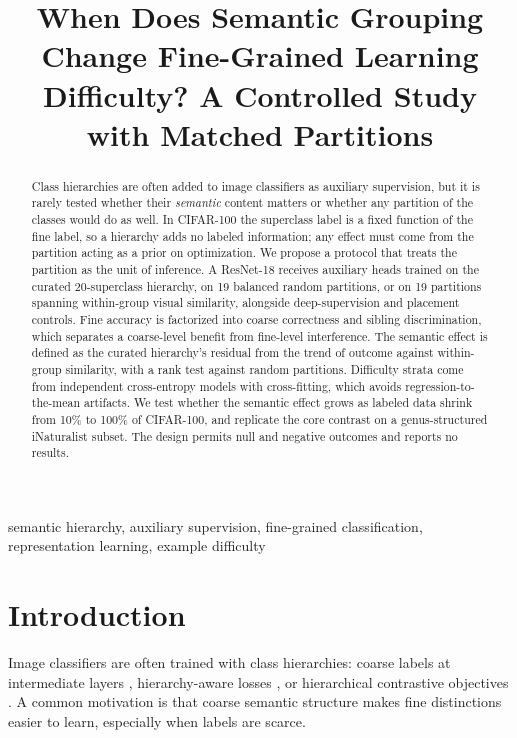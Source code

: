 \documentclass[conference]{IEEEtran}
\begin{document}
\title{When Does Semantic Grouping Change Fine-Grained Learning Difficulty? A Controlled Study with Matched Partitions}
\author{}
\maketitle

\begin{abstract}
Class hierarchies are often added to image classifiers as auxiliary supervision, but it is rarely tested whether their \emph{semantic} content matters or whether any partition of the classes would do as well. In CIFAR-100 the superclass label is a fixed function of the fine label, so a hierarchy adds no labeled information; any effect must come from the partition acting as a prior on optimization. We propose a protocol that treats the partition as the unit of inference. A ResNet-18 receives auxiliary heads trained on the curated 20-superclass hierarchy, on 19 balanced random partitions, or on 19 partitions spanning within-group visual similarity, alongside deep-supervision and placement controls. Fine accuracy is factorized into coarse correctness and sibling discrimination, which separates a coarse-level benefit from fine-level interference. The semantic effect is defined as the curated hierarchy's residual from the trend of outcome against within-group similarity, with a rank test against random partitions. Difficulty strata come from independent cross-entropy models with cross-fitting, which avoids regression-to-the-mean artifacts. We test whether the semantic effect grows as labeled data shrink from 10\% to 100\% of CIFAR-100, and replicate the core contrast on a genus-structured iNaturalist subset. The design permits null and negative outcomes and reports no results.
\end{abstract}

\begin{IEEEkeywords}
semantic hierarchy, auxiliary supervision, fine-grained classification, representation learning, example difficulty
\end{IEEEkeywords}

\section{Introduction}
Image classifiers are often trained with class hierarchies: coarse labels at intermediate layers \cite{yan2015hdcnn,zhu2017bcnn}, hierarchy-aware losses \cite{bertinetto2020mistakes}, or hierarchical contrastive objectives \cite{zhang2022labels}. A common motivation is that coarse semantic structure makes fine distinctions easier to learn, especially when labels are scarce.
\end{document}
